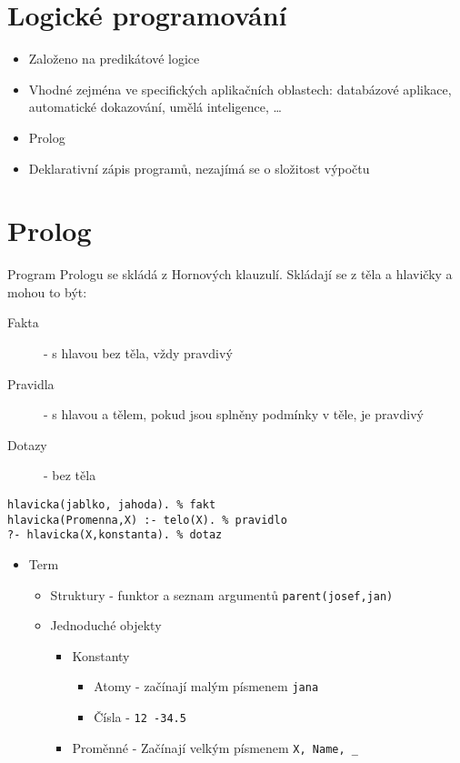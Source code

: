 \documentclass{szzclass}
\begin{document}
\tableofcontents
\newpage

\section{Logické programování}

\begin{itemize}
\item Založeno na predikátové logice
\item Vhodné zejména ve specifických aplikačních oblastech: databázové aplikace, automatické dokazování, umělá inteligence, \dots
\item Prolog
\item Deklarativní zápis programů, nezajímá se o složitost výpočtu
\end{itemize}

\section{Prolog}
Program Prologu se skládá z Hornových klauzulí. Skládají se z těla a hlavičky a mohou to být:
\begin{description}
\item[Fakta] - s hlavou bez těla, vždy pravdivý
\item[Pravidla] - s hlavou a tělem, pokud jsou splněny podmínky v těle, je pravdivý
\item[Dotazy] - bez těla
\end{description}

\begin{verbatim}
hlavicka(jablko, jahoda). % fakt
hlavicka(Promenna,X) :- telo(X). % pravidlo
?- hlavicka(X,konstanta). % dotaz
\end{verbatim}

\begin{itemize}
\item Term
  \begin{itemize}
  \item Struktury - funktor a seznam argumentů \texttt{parent(josef,jan)}
  \item Jednoduché objekty
    \begin{itemize}
    \item Konstanty
      \begin{itemize}
      \item Atomy - začínají malým písmenem \texttt{jana}
      \item Čísla - \texttt{12 -34.5}
      \end{itemize}
    \item Proměnné - Začínají velkým písmenem \texttt{X, Name, _}
    \end{itemize}
  \end{itemize}
\end{itemize}
\end{document}
